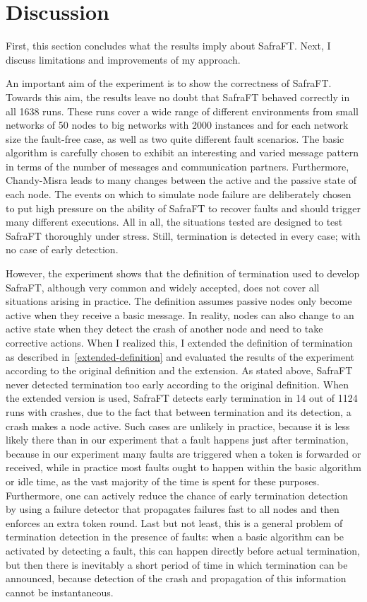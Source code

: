 \section{Discussion}
\label{sec:discussion}
First, this section concludes what the results imply about SafraFT. Next, I discuss limitations and improvements of my approach.

An important aim of the experiment is to show the correctness of SafraFT.
Towards this aim, the results leave no doubt that SafraFT behaved correctly in all 1638 %
runs.
These runs cover a wide range of different environments from small networks of 50 nodes to big networks with 2000 instances and for each network size the fault-free case, as well as two quite different fault scenarios.
The basic algorithm is carefully chosen to exhibit an interesting and varied message pattern in terms of the number of messages and communication partners.
Furthermore, Chandy-Misra leads to many changes between the active and the passive state of each node.
The events on which to simulate node failure are deliberately chosen to put high pressure on the ability of SafraFT to recover faults and should trigger many different executions.
All in all, the situations tested are designed to test SafraFT thoroughly under stress.
Still, termination is detected in every case; with no case of early detection.

However, the experiment shows that the definition of termination used to develop SafraFT, although very common and widely accepted, does not cover all situations arising in practice.
The definition assumes passive nodes only become active when they receive a basic message.
In reality, nodes can also change to an active state when they detect the crash of another node and need to take corrective actions.
When I realized this, I extended the definition of termination as described in~\cref{extended-definition} and evaluated the results of the experiment according to the original definition and the extension.
As stated above, SafraFT never detected termination too early according to the original definition.
When the extended version is used, SafraFT detects early termination in 14 out of 1124 runs with crashes, due to the fact that between termination and its detection, a crash makes a node active. %
Such cases are unlikely in practice, because it is less likely there than in our experiment that a fault happens just after termination, because in our experiment many faults are triggered when a token is forwarded or received, while in practice most faults ought to happen within the basic algorithm or idle time, as the vast majority of the time is spent for these purposes.
Furthermore, one can actively reduce the chance of early termination detection by using a failure detector that propagates failures fast to all nodes and then enforces an extra token round.
Last but not least, this is a general problem of termination detection in the presence of faults:
when a basic algorithm can be activated by detecting a fault, this can happen directly before actual termination, but then there is inevitably a short period of time in which termination can be announced, because detection of the crash  and propagation of this information cannot be instantaneous.

